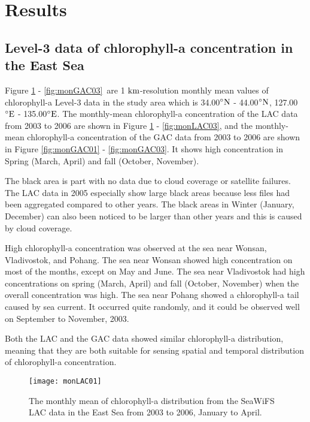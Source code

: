 \section{Results}

\subsection{Level-3 data of chlorophyll-a concentration in the East Sea}

Figure \ref{fig:monLAC01} - \ref{fig:monGAC03}\ are 1 $\rm km$-resolution monthly mean values of chlorophyll-a Level-3 data in the study area which is 34.00$\rm^{\circ}N$ - 44.00$\rm^{\circ}N$, 127.00$\rm^{\circ}E$ - 135.00$\rm^{\circ}E$. The monthly-mean chlorophyll-a concentration of the LAC data from 2003 to 2006 are shown in Figure \ref{fig:monLAC01} - \ref{fig:monLAC03}, and the monthly-mean chlorophyll-a concentration of the GAC data from 2003 to 2006 are shown in Figure \ref{fig:monGAC01} - \ref{fig:monGAC03}. It shows high concentration in Spring (March, April) and fall (October, November).

The black area is part with no data due to cloud coverage or satellite failures. The LAC data in 2005 especially show large black areas because less files had been aggregated compared to other years. The black areas in Winter (January, December) can also been noticed to be larger than other years and this is caused by cloud coverage.

High chlorophyll-a concentration was observed at the sea near Wonsan, Vladivostok, and Pohang. The sea near Wonsan showed high concentration on most of the months, except on May and June. The sea near Vladivostok had high concentrations on spring (March, April) and fall (October, November) when the overall concentration was high. The sea near Pohang showed a chlorophyll-a tail caused by sea current. It occurred quite randomly, and it could be observed well on September to November, 2003. 

Both the LAC and the GAC data showed similar chlorophyll-a distribution, meaning that they are both suitable for sensing spatial and temporal distribution of chlorophyll-a concentration.

\begin{figure}[h]
	\centering
	\texttt{[image: monLAC01]}\\
	\caption{The monthly mean of chlorophyll-a distribution from the SeaWiFS LAC data in the East Sea from 2003 to 2006, January to April.}
	\label{fig:monLAC01}
\end{figure}


